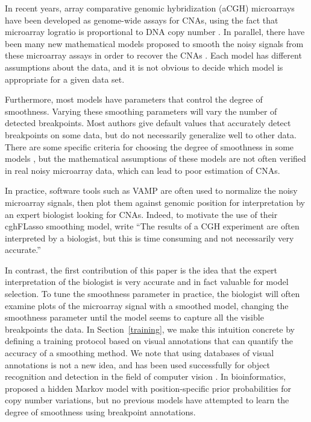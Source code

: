 \documentclass{bioinfo}
\begin{document}
In recent years, array comparative genomic hybridization (aCGH)
microarrays have been developed as genome-wide assays for CNAs, using
the fact that microarray logratio is proportional to DNA copy number
\citep{pinkel}. In parallel, there have been many new mathematical
models proposed to smooth the noisy signals from these microarray
assays in order to recover the CNAs
\citep{glad,statistical-approach,dnacopy,cghFLasso,haarseg,fused-lasso-path}.
Each model has different assumptions about the data, and it is not
obvious to decide which model is appropriate for a given data set.

Furthermore, most models have parameters that control the degree
of smoothness. Varying these smoothing parameters will vary the number
of detected breakpoints. Most authors give default values that
accurately detect breakpoints on some data, but do not necessarily
generalize well to other data. There are some specific criteria for
choosing the degree of smoothness in some models
\citep{lavielle2005,mBIC,penalized-cna}, but the mathematical
assumptions of these models are not often verified in real noisy
microarray data, which can lead to poor estimation of CNAs.

In practice, software tools such as VAMP \citep{vamp} are often used to
normalize the noisy microarray signals, then plot them
 against genomic position for interpretation
by an expert biologist looking for CNAs. Indeed, to motivate the use
of their cghFLasso smoothing model, \cite{cghFLasso} write ``The
results of a CGH experiment are often interpreted by a biologist, but
this is time consuming and not necessarily very accurate.''

In contrast, the first contribution of this paper is the idea that the
expert interpretation of the biologist is very accurate and in fact
valuable for model selection. To tune the smoothness parameter in
practice, the biologist will often examine plots of the microarray
signal with a smoothed model, changing the smoothness parameter until
the model seems to capture all the visible breakpoints the data. In
Section~\ref{training}, we make this intuition concrete by defining a
training protocol based on visual annotations that can
quantify the accuracy of a smoothing method. We note that using
databases of visual annotations is not a new idea, and has been used
successfully for object recognition and detection in the field of
computer vision \citep{labelme}. In bioinformatics, \cite{shah}
proposed a hidden Markov model with position-specific prior
probabilities for copy number variations, but no previous models have
attempted to learn the degree of smoothness using breakpoint
annotations.
\end{document}
